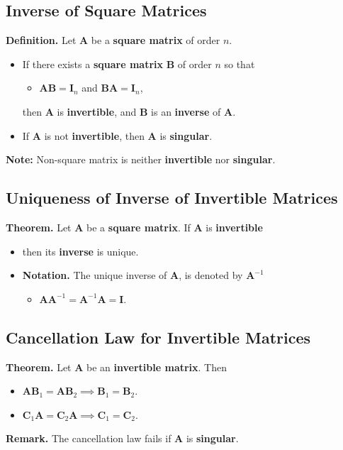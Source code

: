 \documentclass[../ma2001_notes.tex]{subfiles}
\begin{document}
\subsection{Inverse of Square Matrices}
\textbf{Definition.} Let \(\bm{A}\) be a \textbf{square matrix} of order \(n\).
\begin{itemize}
	\item If there exists a \textbf{square matrix} \(\bm{B}\) of order \(n\) so that
	\begin{itemize}
		\item\(\bm{AB}=\bm{I}_n\) and \(\bm{BA}=\bm{I}_n\),
	\end{itemize}
	then \(\bm{A}\) is \textbf{invertible}, and \(\bm{B}\) is an \textbf{inverse} of \(\bm{A}\).
	\item If \(\bm{A}\) is not \textbf{invertible}, then \(\bm{A}\) is \textbf{singular}.
\end{itemize}
\textbf{Note:} Non-square matrix is neither \textbf{invertible} nor \textbf{singular}.

\subsection{Uniqueness of Inverse of Invertible Matrices}
\textbf{Theorem.} Let \(\bm{A}\) be a \textbf{square matrix}. If \(\bm{A}\) is \textbf{invertible}
\begin{itemize}
	\item then its \textbf{inverse} is unique.
	\item\textbf{Notation.} The unique inverse of \(\bm{A}\), is denoted by \(\bm{A}^{-1}\)
	\begin{itemize}
		\item\(\bm{AA}^{-1}=\bm{A}^{-1}\bm{A}=\bm{I}\).
	\end{itemize}
\end{itemize}

\subsection{Cancellation Law for Invertible Matrices}
\textbf{Theorem.} Let \(\bm{A}\) be an \textbf{invertible matrix}. Then
\begin{itemize}
	\item\(\bm{AB}_1=\bm{AB}_2\implies\bm{B}_1=\bm{B}_2\).
	\item\(\bm{C}_1\bm{A}=\bm{C}_2\bm{A}\implies\bm{C}_1=\bm{C}_2\).
\end{itemize}
\textbf{Remark.} The cancellation law fails if \(\bm{A}\) is \textbf{singular}.
\end{document}
